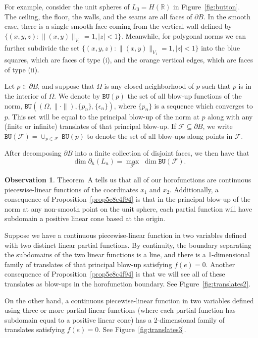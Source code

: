 \documentclass{article}
\theoremstyle{definition}
\newtheorem{observation}[theorem]{Observation}
\newcommand{\BU}{\mathtt{BU}}
\newcommand{\norm}[1]{\|#1\|}
\newcommand{\bhor}{\partial_h}
\newcommand{\R}{{\mathbb R}}
\newcommand{\cF}{{\mathcal F}}
\begin{document}
For example, consider the unit spheres of $L_3 = H(\R)$ in Figure~\ref{fig:button}. The ceiling, the floor, the walls, and the seams are all faces of $\partial B$. In the smooth case, there is a single smooth face coming from the vertical wall defined by $\{(x, y, z) : \norm{(x,y)}_{V_1} = 1, |z| < 1\}$. Meanwhile, for polygonal norms we can further subdivide the set $\{(x, y, z) : \norm{(x,y)}_{V_1} = 1, |z| < 1\}$ into the blue squares, which are faces of type (i), and the orange vertical edges, which are faces of type (ii).

Let $p \in \partial B$, and suppose that $\Omega$ is any closed neighborhood of $p$ such that $p$ is in the interior of $\Omega$. We denote by $\BU(p)$ the set of all blow-up functions of the norm, $\BU((\Omega, \norm{\cdot}), \{p_n\},\{\epsilon_n\})$, where $\{p_n\}$ is a sequence which converges to $p$. This set will be equal to the principal blow-up of the norm at $p$ along with any (finite or infinite) translates of that principal blow-up. If $\cF \subseteq \partial B$, we write $\BU(\cF) = \cup_{p \in \cF} \:\BU(p)$ to denote the set of all blow-ups along points in $\cF$.

After decomposing $\partial B$ into a finite collection of disjoint faces, we then have that
\[\dim \bhor(L_n) = \max_{\cF} \;\dim \BU (\cF).
\]



\begin{observation}\label{obs:translates} Theorem~A tells us that all of our horofunctions are continuous piecewise-linear functions of the coordinates $x_1$ and $x_2$. Additionally, a consequence of Proposition~\ref{prop5e8c4f94} is that in the principal blow-up of the norm at any non-smooth point on the unit sphere, each partial function will have subdomain a positive linear cone based at the origin.

Suppose we have a continuous piecewise-linear function in two variables defined with two distinct linear partial functions. By continuity, the boundary separating the subdomains of the two linear functions is a line, and there is a 1-dimensional family of translates of that principal blow-up satisfying $f(e) = 0$. Another consequence of Proposition~\ref{prop5e8c4f94} is that we will see all of these translates as blow-ups in the horofunction boundary. See Figure~\ref{fig:translates2}.

On the other hand, a continuous piecewise-linear function in two variables defined using three or more partial linear functions (where each partial function has subdomain equal to a positive linear cone) has a 2-dimensional family of translates satisfying $f(e) = 0$. See Figure~\ref{fig:translates3}.

\end{observation}
\end{document}
